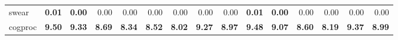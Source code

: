 \begin{table*}[h!]
{\begin{tabular}{lrr|rrrrrr|rrrrrr}
swear & \textbf{0.01} & \textbf{0.00} & 0.00 & 0.00 & 0.00 & 0.00 & 0.00 & 0.00 & \textbf{0.01} & \textbf{0.00} & 0.00 & 0.00 & 0.00 & 0.00 \\
cogproc & \textbf{9.50} & \textbf{9.33} & \textbf{8.69} & \textbf{8.34} & \textbf{8.52} & \textbf{8.02} & \textbf{9.27} & \textbf{8.97} & \textbf{9.48} & \textbf{9.07} & \textbf{8.60} & \textbf{8.19} & \textbf{9.37} & \textbf{8.99} \\
\bottomrule
\end{tabular}
} 
\label{tab:correlation_gender}
\end{table*}